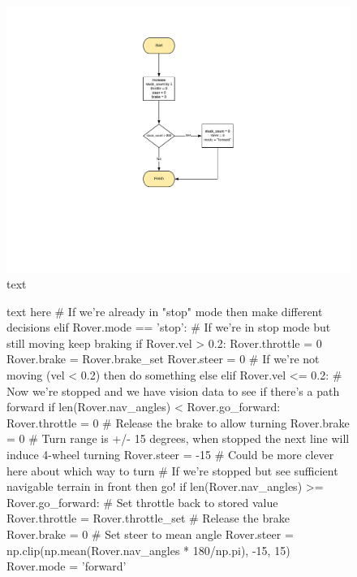 \documentclass[a4paper]{article}
\begin{document}
\begin{figure}[h]
\hspace{-1cm}
\includegraphics[scale=0.6]{stuck_flow}
\caption{text}
\end{figure}

\begin{figure}[h]\scriptsize
\begin{sexylisting}{text here}
# If we're already in "stop" mode then make different decisions
        elif Rover.mode == 'stop':
            # If we're in stop mode but still moving keep braking
            if Rover.vel > 0.2:
                Rover.throttle = 0
                Rover.brake = Rover.brake_set
                Rover.steer = 0
            # If we're not moving (vel < 0.2) then do something else
            elif Rover.vel <= 0.2:
                # Now we're stopped and we have vision data to see if there's a path forward
                if len(Rover.nav_angles) < Rover.go_forward:
                    Rover.throttle = 0
                    # Release the brake to allow turning
                    Rover.brake = 0
                    # Turn range is +/- 15 degrees, when stopped the next line will induce 4-wheel turning
                    Rover.steer = -15 # Could be more clever here about which way to turn
                # If we're stopped but see sufficient navigable terrain in front then go!
                if len(Rover.nav_angles) >= Rover.go_forward:
                    # Set throttle back to stored value
                    Rover.throttle = Rover.throttle_set
                    # Release the brake
                    Rover.brake = 0
                    # Set steer to mean angle
                    Rover.steer = np.clip(np.mean(Rover.nav_angles * 180/np.pi), -15, 15)
                    Rover.mode = 'forward'
\end{sexylisting}
\end{figure}
\end{document}
